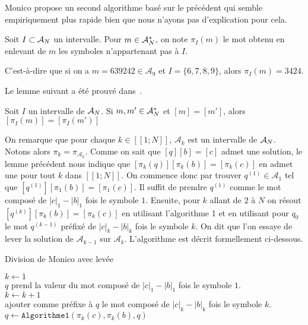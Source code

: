 \pagebreak
Monico propose un second algorithme basé sur le précédent qui semble empiriquement plus rapide bien que nous n'ayons pas d'explication pour cela. 
\begin{definition}
	Soit $I \subset \mathcal{A}_N$ un intervalle. Pour $m \in \mathcal{A}_N^*$, on note $\pi_I(m)$ le mot obtenu en enlevant de $m$ les symboles n'appartenant pas à $I$.
\end{definition}
C'est-à-dire que si on a $m=639242 \in \mathcal{A}_9$ et $I = \{6,7,8,9\}$, alors $\pi_I(m)=3424$.

Le lemme suivant a été prouvé dans~\cite{lothaire2002algebraic}.
\begin{lemma}
	Soit $I$ un intervalle de $\mathcal{A}_N$. Si $m,m' \in \mathcal{A}_N^*$ et $[m]=[m']$, alors $[\pi_I(m)]=[\pi_I(m')]$
\end{lemma}

On remarque que pour chaque $k \in [\![1;N]\!]$, $\mathcal{A}_k$ est un intervalle de $\mathcal{A}_N$. Notons alors $\pi_k = \pi_{\mathcal{A}_k}$. Comme on sait que $[q][b]=[c]$ admet une solution, le lemme précédent nous indique que $[\pi_k(q)][\pi_k(b)]=[\pi_k(c)]$ en admet une pour tout $k$ dans $[\![1;N]\!]$. On commence donc par trouver $q^{(1)} \in \mathcal{A}_1$ tel que $[q^{(1)}][\pi_1(b)]=[\pi_1(c)]$. Il suffit de prendre $q^{(1)}$ comme le mot composé de $|c|_1-|b|_1$ fois le symbole $1$. Ensuite, pour $k$ allant de $2$ à $N$ on résout $[q^{(k)}][\pi_k(b)]=[\pi_k(c)]$ en utilisant l'algorithme 1 et en utilisant pour $q_0$ le mot $q^{(k-1)}$ préfixé de $|c|_k-|b|_k$ fois le symbole $k$. On dit que l'on essaye de lever la solution de $\mathcal{A}_{k-1}$ sur $\mathcal{A}_k$. L'algorithme est décrit formellement ci-dessous.

\begin{algorithm}
	\caption{Division de Monico avec levée} \label{alg:mon2}
	$k \gets 1$ \\
	$q$ prend la valeur du mot composé de $|c|_1-|b|_1$ fois le symbole $1$. \\
	{
		$k \gets k+1$ \\
		ajouter comme préfixe à $q$ le mot composé de $|c|_k-|b|_k$ fois le symbole $k$. \\
		$q \gets \texttt{Algorithme1}(\pi_k(c), \pi_k(b), q)$
	}
\end{algorithm}

